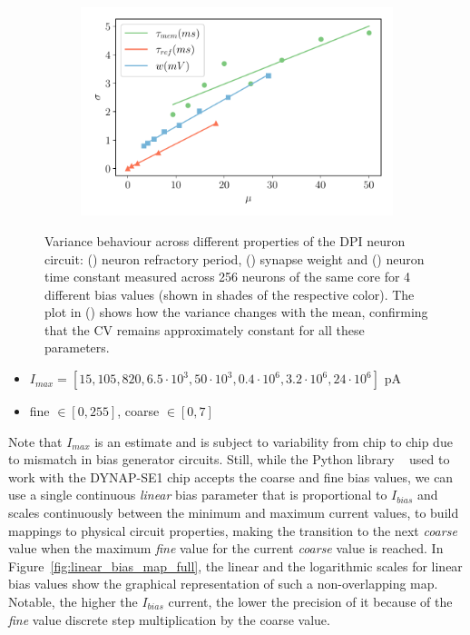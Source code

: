 \begin{figure}[b!]
\begin{subfigure}{.47\textwidth}
    \subcaption{}
    \label{fig:neuron_tau_scaling}
  \end{subfigure}
  \centering
  \begin{subfigure}{.47\textwidth}
    \includegraphics[width=\textwidth]{img/chapter4/scaling_all.pdf}
    \subcaption{}
    \label{fig:bias_CV_scaling}
  \end{subfigure}
  \caption[Variance behaviour across different properties of the DPI neuron circuit (parameter scaling)]{Variance behaviour across different properties of the DPI neuron circuit: () neuron refractory period, () synapse weight and () neuron time constant measured across 256 neurons of the same core for 4 different bias values (shown in shades of the respective color).
  The plot in () shows how the variance changes with the mean, confirming that the CV remains approximately constant for all these parameters.}
  \label{fig:variance}
\end{figure}

 \begin{itemize}
     \item $I_{max} =[15,105,820,6.5 \cdot 10^3, 50 \cdot 10^3, 0.4 \cdot 10^6, 3.2 \cdot 10^6, 24 \cdot 10^6]$ pA
     \item fine $\in [0,255]$, coarse $\in [0,7]$
 \end{itemize}


Note that $I_{max}$ is an estimate and is subject to variability from chip to chip due to mismatch in bias generator circuits. Still, while the Python library ~\cite{Samna} used to work with the DYNAP-SE1 chip accepts the coarse and fine bias values, we can use a single continuous \emph{linear} bias parameter that is proportional to $I_{bias}$ and scales continuously between the minimum and maximum current values, to build mappings to physical circuit properties, making the transition to the next \emph{coarse} value when the maximum \emph{fine} value for the current \emph{coarse} value is reached. In Figure~\ref{fig:linear_bias_map_full}, the linear and the logarithmic scales for linear bias values show the graphical representation of such a non-overlapping map. Notable, the higher the $I_{bias}$ current, the lower the precision of it because of the \emph{fine} value discrete step multiplication by the coarse value.

